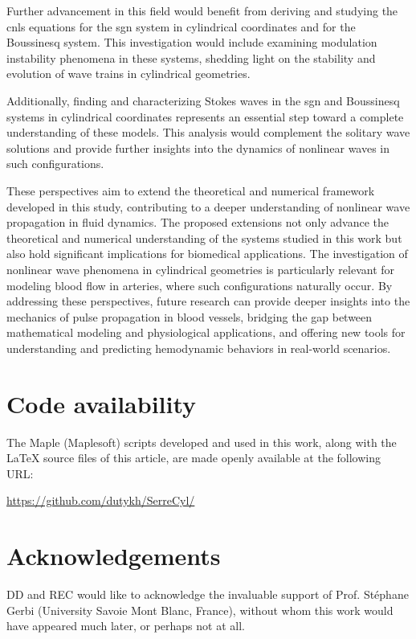 \documentclass[alpha-refs, 12pt]{wiley-article}
\begin{document}
Further advancement in this field would benefit from deriving and studying the \acrfull{cnls} equations for the \acrshort{sgn} system in cylindrical coordinates and for the Boussinesq system. This investigation would include examining modulation instability phenomena in these systems, shedding light on the stability and evolution of wave trains in cylindrical geometries.

Additionally, finding and characterizing Stokes waves in the \acrshort{sgn} and Boussinesq systems in cylindrical coordinates represents an essential step toward a complete understanding of these models. This analysis would complement the solitary wave solutions and provide further insights into the dynamics of nonlinear waves in such configurations.

These perspectives aim to extend the theoretical and numerical framework developed in this study, contributing to a deeper understanding of nonlinear wave propagation in fluid dynamics. The proposed extensions not only advance the theoretical and numerical understanding of the systems studied in this work but also hold significant implications for biomedical applications. The investigation of nonlinear wave phenomena in cylindrical geometries is particularly relevant for modeling blood flow in arteries, where such configurations naturally occur. By addressing these perspectives, future research can provide deeper insights into the mechanics of pulse propagation in blood vessels, bridging the gap between mathematical modeling and physiological applications, and offering new tools for understanding and predicting hemodynamic behaviors in real-world scenarios.

\vspace*{1.5em}

\section*{Code availability}

The Maple (Maplesoft\texttrademark) scripts developed and used in this work, along with the LaTeX source files of this article, are made openly available at the following URL:

\url{https://github.com/dutykh/SerreCyl/}

\section*{Acknowledgements}

DD and REC would like to acknowledge the invaluable support of Prof. St\'ephane Gerbi (University Savoie Mont Blanc, France), without whom this work would have appeared much later, or perhaps not at all.
\end{document}
